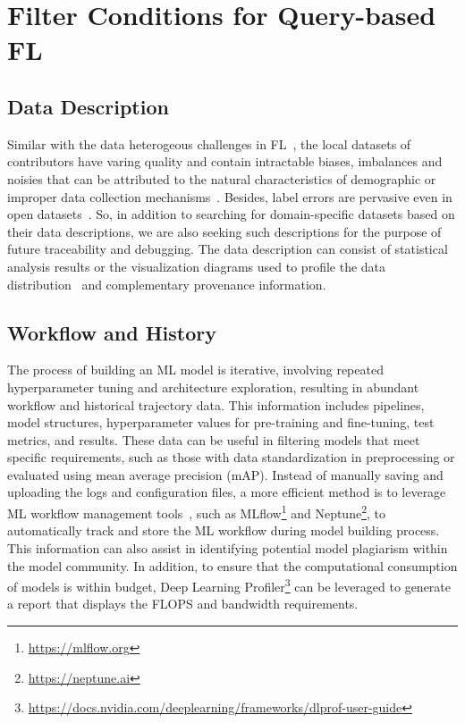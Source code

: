 \documentclass[journal]{IEEEtran}
\begin{document}
\section{Filter Conditions for Query-based FL}
\label{apdx:filter}
\subsection{Data Description} %
Similar with the data heterogeous challenges in FL~\cite{liqb2022federated}, the local datasets of contributors have varing quality and contain intractable biases, imbalances and noisies that can be attributed to the natural characteristics of demographic or improper data collection mechanisms~\cite{dayan2021federated}.
Besides, label errors are pervasive even in open datasets~\cite{northcutt2021pervasive}. 
So, in addition to searching for domain-specific datasets based on their data descriptions, we are also seeking such descriptions for the purpose of future traceability and debugging.
The data description can consist of statistical analysis results or the visualization diagrams used to profile the data distribution~\cite{li2020multi} and complementary provenance information.

\subsection{Workflow and History}
\label{sec:workflow&history}
The process of building an ML model is iterative, involving repeated hyperparameter tuning and architecture exploration, resulting in abundant workflow and historical trajectory data.
This information includes pipelines, model structures, hyperparameter values for pre-training and fine-tuning, test metrics, and results. 
These data can be useful in filtering models that meet specific requirements, such as those with data standardization in preprocessing or evaluated using mean average precision (mAP).
Instead of manually saving and uploading the logs and configuration files, a more efficient method is to leverage ML workflow management tools~\cite{vartak2016modeldb}, such as MLflow\footnote{\url{https://mlflow.org}} and Neptune\footnote{\url{https://neptune.ai}}, to automatically track and store the ML workflow during model building process. 
This information can also assist in identifying potential model plagiarism within the model community.
In addition, to ensure that the computational consumption of models is within budget, Deep Learning Profiler\footnote{\url{https://docs.nvidia.com/deeplearning/frameworks/dlprof-user-guide}} can be leveraged to generate a report that displays the FLOPS and bandwidth requirements.
\end{document}
